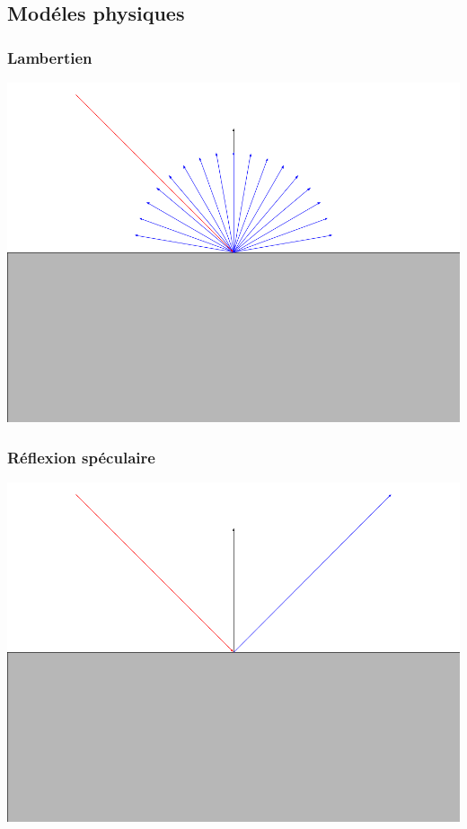 \documentclass[handout]{beamer}
\begin{document}
\subsection{Modéles physiques}

\begin{frame}
    \frametitle{Lambertien}
    \includegraphics[scale=0.3]{Lambertian.png}
\end{frame}

\begin{frame}
    \frametitle{Réflexion spéculaire}
    \includegraphics[scale=0.3]{Metal.png}
\end{frame}
\end{document}
